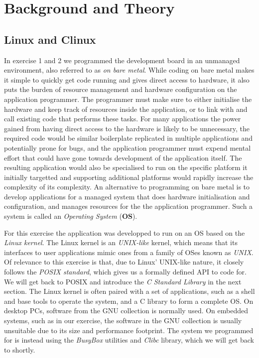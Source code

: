\chapter{Background and Theory}

\section{Linux and \textmu Clinux}

In exercise 1 and 2 we programmed the development board in an unmanaged
environment, also referred to as \emph{on bare metal}. While coding on bare
metal makes it simple to quickly get code running and gives direct access to
hardware, it also puts the burden of resource management and hardware
configuration on the application programmer. The programmer must make sure to
either initialise the hardware and keep track of resources inside the
application, or to link with and call existing code that performs these tasks.
For many applications the power gained from having direct access to the hardware
is likely to be unnecessary, the required code would be similar boilerplate
replicated in multiple applications and potentially prone for bugs, and the
application programmer must expend mental effort that could have gone towards
development of the application itself. The resulting application would also be
specialised to run on the specific platform it initially targetted and
supporting additional platforms would rapidly increase the complexity of its
complexity. An alternative to programming on bare metal is to develop
applications for a managed system that does hardware initialisation and
configuration, and manages resources for the the application programmer. Such a
system is called an \emph{Operating System} (\textbf{OS}).

For this exercise the application was developped to run on an OS based on the
\emph{Linux kernel}. The Linux kernel is an \emph{UNIX-like} kernel, which means
that its interfaces to user applications mimic ones from a family of OSes known
as \emph{UNIX}. Of relevance to this exercise is that, due to Linux' UNIX-like
nature, it closely follows the \emph{POSIX standard}, which gives us a formally
defined API to code for. We will get back to POSIX and introduce the \emph{C
Standard Library} in the next section. The Linux kernel is often paired with a
set of applications, such as a shell and base tools to operate the system, and a
C library to form a complete OS. On desktop PCs, software from the GNU
collection is normally used. On embedded systems, such as in our exercise, the
software in the GNU collection is usually unsuitable due to its size and
performance footprint. The system we programmed for is instead using the
\emph{BusyBox} utilities and \emph{\textmu Clibc} library, which we will get
back to shortly.

